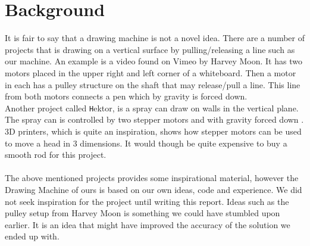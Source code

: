 
\section{Background}
It is fair to say that a drawing machine is not a novel idea. There are a number of projects that is drawing on a vertical surface by pulling/releasing a line such as our machine. An example is a video found on Vimeo\citep{Vimio:2010:DrawingMachine} by Harvey Moon. It has two motors placed in the upper right and left corner of a whiteboard. Then a motor in each has a pulley structure on the shaft that may release/pull a line. This line from both motors connects a pen which by gravity is forced down.\\ Another project called {\texttt Hektor}, is  a spray can draw on walls in the vertical plane. The spray can is controlled by two stepper motors and with gravity forced down \citep{Hektor}. %
3D printers, which is quite an inspiration, shows how stepper motors can be used to move a head in 3 dimensions. It would though be quite expensive to buy a smooth rod for this project.
\\\\
The above mentioned projects provides some inspirational material, however the Drawing Machine of ours is based on our own ideas, code and experience.  We did not seek inspiration for the project until writing this report. Ideas such as the pulley setup from Harvey Moon is something we could have stumbled upon earlier. It is an idea that might have improved the accuracy of the solution we ended up with.

